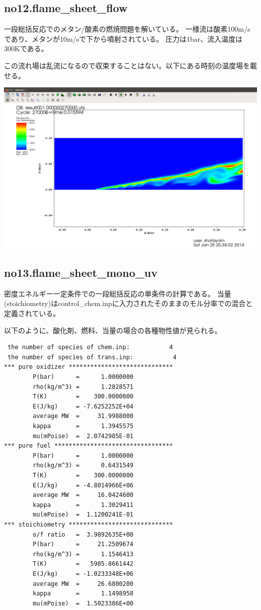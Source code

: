 \documentclass{jsarticle}
\begin{document}
\subsection{no12.flame\_sheet\_flow}%
一段総括反応でのメタン/酸素の燃焼問題を解いている。
一様流は酸素100m/sであり、メタンが10m/sで下から噴射されている。
圧力は1bar、流入温度は300Kである。

この流れ場は乱流になるので収束することはない。以下にある時刻の温度場を載せる。
\begin{center}
\includegraphics[width=.9\textwidth,bb=0 0 1661 1055]{sample/no12.png}
\end{center}
\subsection{no13.flame\_sheet\_mono\_uv}%
密度エネルギー一定条件での一段総括反応の単条件の計算である。
当量(stoichiometry)はcontrol\_chem.inpに入力されたそのままのモル分率での混合と定義されている。

以下のように、酸化剤、燃料、当量の場合の各種物性値が見られる。
\begin{verbatim}
 the number of species of chem.inp:           4
 the number of species of trans.inp:           4
*** pure oxidizer *****************************
        P(bar)      =      1.0000000
        rho(kg/m^3) =      1.2828571
        T(K)        =    300.0000000
        E(J/kg)     = -7.6252252E+04
        average MW  =     31.9988000
        kappa       =      1.3945575
        mu(mPoise)  =  2.0742985E-01
*** pure fuel *********************************
        P(bar)      =      1.0000000
        rho(kg/m^3) =      0.6431549
        T(K)        =    300.0000000
        E(J/kg)     = -4.8014966E+06
        average MW  =     16.0424600
        kappa       =      1.3029411
        mu(mPoise)  =  1.1200241E-01
*** stoichiometry *****************************
        o/f ratio   =  3.9892635E+00
        P(bar)      =     21.2509674
        rho(kg/m^3) =      1.1546413
        T(K)        =   5905.8661442
        E(J/kg)     = -1.0233348E+06
        average MW  =     26.6800200
        kappa       =      1.1498958
        mu(mPoise)  =  1.5023386E+00
\end{verbatim}
\end{document}
